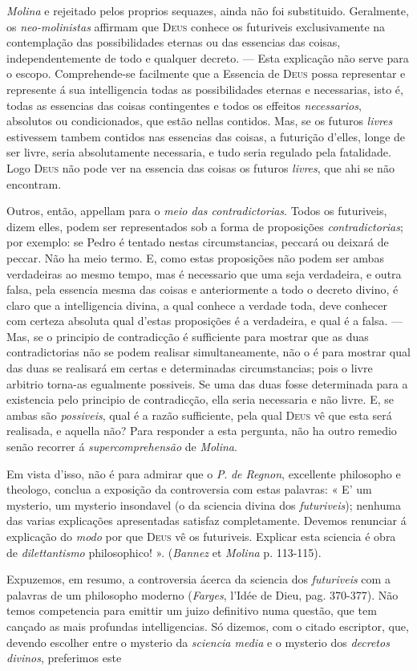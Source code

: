 \emph{Molina} e rejeitado pelos proprios sequazes, ainda não foi substituido. Geralmente, os \emph{neo-molinistas} affirmam que \textsc{Deus} conhece os futuriveis exclusivamente na contemplação das possibilidades eternas ou das essencias das coisas, independentemente de todo e qualquer decreto. --- Esta explicação não serve para o escopo. Comprehende-se facilmente que a Essencia de \textsc{Deus} possa representar e represente á sua intelligencia todas as possibilidades eternas e necessarias, isto é, todas as essencias das coisas contingentes e todos os effeitos \emph{necessarios}, absolutos ou condicionados, que estão nellas contidos. Mas, se os futuros \emph{livres} estivessem tambem contidos nas essencias das coisas, a futurição d'elles, longe de ser livre, seria absolutamente necessaria, e tudo seria regulado pela fatalidade. Logo \textsc{Deus} não pode ver na essencia das coisas os futuros \emph{livres}, que ahi se não encontram.\par Outros, então, appellam para o \emph{meio das contradictorias}. Todos os futuriveis, dizem elles, podem ser representados sob a forma de proposições \emph{contradictorias}; por exemplo: se Pedro é tentado nestas circumstancias, peccará ou deixará de peccar. Não ha meio termo. E, como estas proposições não podem ser ambas verdadeiras ao mesmo tempo, mas é necessario que uma seja verdadeira, e outra falsa, pela essencia mesma das coisas e anteriormente a todo o decreto divino, é claro que a intelligencia divina, a qual conhece a verdade toda, deve conhecer com certeza absoluta qual d'estas proposições é a verdadeira, e qual é a falsa. --- Mas, se o principio de contradicção é sufficiente para mostrar que as duas contradictorias não se podem realisar simultaneamente, não o é para mostrar qual das duas se realisará em certas e determinadas circumstancias; pois o livre arbitrio torna-as egualmente possiveis. Se uma das duas fosse determinada para a existencia pelo principio de contradicção, ella seria necessaria e não livre. E, se ambas são \emph{possiveis}, qual é a razão sufficiente, pela qual \textsc{Deus} vê que esta será realisada, e aquella não? Para responder a esta pergunta, não ha outro remedio senão recorrer á \emph{supercomprehensão} de \emph{Molina}.\par Em vista d'isso, não é para admirar que o \emph{P}. \emph{de Regnon}, excellente philosopho e theologo, conclua a exposição da controversia com estas palavras: « E' um mysterio, um mysterio insondavel (o da sciencia divina dos \emph{futuriveis}); nenhuma das varias explicações apresentadas satisfaz completamente. Devemos renunciar á explicação do \emph{modo} por que \textsc{Deus} vê os futuriveis. Explicar esta sciencia é obra de \emph{dilettantismo} philosophico! ». (\emph{Bannez} et \emph{Molina} p. 113-115).\par Expuzemos, em resumo, a controversia ácerca da sciencia dos \emph{futuriveis} com a palavras de um philosopho moderno (\emph{Farges}, l'Idée de Dieu, pag. 370-377). Não temos competencia para emittir um juizo definitivo numa questão, que tem cançado as mais profundas intelligencias. Só dizemos, com o citado escriptor, que, devendo escolher entre o mysterio da \emph{sciencia media} e o mysterio dos \emph{decretos divinos}, preferimos este 
